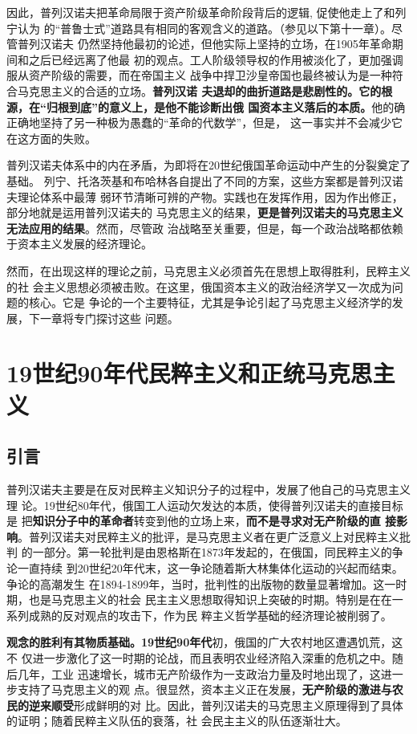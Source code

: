 因此，普列汉诺夫把革命局限于资产阶级革命阶段背后的逻辑, 促使他走上了和列宁认为
的“普鲁士式”道路具有相同的客观含义的道路。（参见以下第十一章）。尽管普列汉诺夫
仍然坚持他最初的论述，但他实际上坚持的立场，在1905年革命期间和之后已经远离了他最
初的观点。工人阶级领导权的作用被淡化了，更加强调服从资产阶级的需要，而在帝国主义
战争中捍卫沙皇帝国也最终被认为是一种符合马克思主义的合适的立场。\textbf{普列汉诺
  夫退却的曲折道路是悲剧性的。它的根源，在“归根到底”的意义上，是他不能诊断出俄
  国资本主义落后的本质。}他的确正确地坚持了另一种极为愚蠢的“革命的代数学”，但是，
这一事实并不会减少它在这方面的失败。

普列汉诺夫体系中的内在矛盾，为即将在20世纪俄国革命运动中产生的分裂奠定了基础。
列宁、托洛茨基和布哈林各自提出了不同的方案，这些方案都是普列汉诺夫理论体系中最薄
弱环节清晰可辨的产物。实践也在发挥作用，因为作出修正，部分地就是运用普列汉诺夫的
马克思主义的结果，\textbf{更是普列汉诺夫的马克思主义无法应用的结果}。然而，尽管政
治战略至关重要，但是，每一个政治战略都依赖于资本主义发展的经济理论。

然而，在出现这样的理论之前，马克思主义必须首先在思想上取得胜利，民粹主义的社
会主义思想必须被击败。在这里，俄国资本主义的政治经济学又一次成为问题的核心。它是
争论的一个主要特征，尤其是争论引起了马克思主义经济学的发展，下一章将专门探讨这些
问题。

\chapter{19世纪90年代民粹主义和正统马克思主义}

\section{引言}
普列汉诺夫主要是在反对民粹主义知识分子的过程中，发展了他自己的马克思主义理
论。19世纪80年代，俄国工人运动欠发达的本质，使得普列汉诺夫的直接目标是
把\textbf{知识分子中的革命者}转变到他的立场上来，\textbf{而不是寻求对无产阶级的直
  接影响}。普列汉诺夫对民粹主义的批评，是马克思主义者在更广泛意义上对民粹主义批判
的一部分。第一轮批判是由恩格斯在1873年发起的，在俄国，同民粹主义的争论一直持续
到20世纪20年代末，这一争论随着斯大林集体化运动的兴起而结束。争论的高潮发生
在1894-1899年，当时，批判性的出版物的数量显著增加。这一时期，也是马克思主义的社会
民主主义思想取得知识上突破的时期。特别是在在一系列成熟的反对观点的攻击下，作为民
粹主义哲学基础的经济理论被削弱了。

\textbf{观念的胜利有其物质基础。19世纪90年代}初，俄国的广大农村地区遭遇饥荒，这不
仅进一步激化了这一时期的论战，而且表明农业经济陷入深重的危机之中。随后几年，工业
迅速增长，城市无产阶级作为一支政治力量及时地出现了，这进一步支持了马克思主义的观
点。很显然，资本主义正在发展，\textbf{无产阶级的激进与农民的逆来顺受}形成鲜明的对
比。因此，普列汉诺夫的马克思主义原理得到了具体的证明；随着民粹主义队伍的衰落，社
会民主主义的队伍逐渐壮大。

